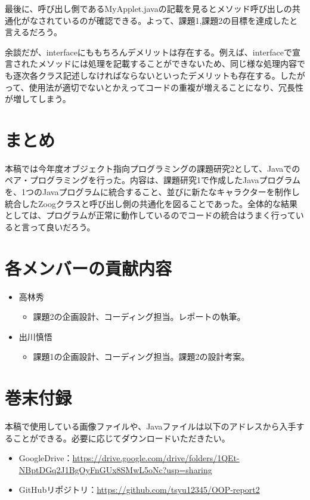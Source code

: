 \documentclass[dvipdfmx]{jsarticle}
\begin{document}
最後に、呼び出し側であるMyApplet.javaの記載を見るとメソッド呼び出しの共通化がなされているのが確認できる。よって、課題1,課題2の目標を達成したと言えるだろう。\par
余談だが、interfaceにももちろんデメリットは存在する。例えば、interfaceで宣言されたメソッドには処理を記載することができないため、同じ様な処理内容でも逐次各クラス記述しなければならないといったデメリットも存在する。したがって、使用法が適切でないとかえってコードの重複が増えることになり、冗長性が増してしまう。
\section{まとめ}
本稿では今年度オブジェクト指向プログラミングの課題研究2として、Javaでのペア・プログラミングを行った。内容は、課題研究1で作成したJavaプログラムを、1つのJavaプログラムに統合すること、並びに新たなキャラクターを制作し統合したZoogクラスと呼び出し側の共通化を図ることであった。全体的な結果としては、プログラムが正常に動作しているのでコードの統合はうまく行っていると言って良いだろう。
\section{各メンバーの貢献内容}
\begin{itemize}
  \item 高林秀
  \begin{itemize}
    \item 課題2の企画設計、コーディング担当。レポートの執筆。
  \end{itemize}
  \item 出川慎悟
  \begin{itemize}
    \item 課題1の企画設計、コーディング担当。課題2の設計考案。
  \end{itemize}
\end{itemize}
\section{巻末付録}
本稿で使用している画像ファイルや、Javaファイルは以下のアドレスから入手することができる。必要に応じてダウンロードいただきたい。
\begin{itemize}
  \item GoogleDrive：\url{https://drive.google.com/drive/folders/1QEt-NBptDGq2J1BgOyFnGUx8SMwL5oNc?usp=sharing}
  \item GitHubリポジトリ：\url{https://github.com/tsyu12345/OOP-report2}
\end{itemize}
\end{document}
